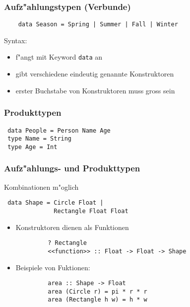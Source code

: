 \documentclass[german,10pt, a4paper, twocolumn]{scrartcl}
\theoremstyle{definition}
\theoremstyle{remark}
\begin{document}
\subsubsection{Aufz"ahlungstypen (Verbunde)}

\small
\begin{verbatim}
	data Season = Spring | Summer | Fall | Winter
\end{verbatim}
\normalsize

Syntax:
\begin{itemize}
	\item f"angt mit Keyword \verb#data# an
	\item gibt verschiedene eindeutig genannte Konstruktoren
	\item erster Buchstabe von Konstruktoren muss gross sein
\end{itemize}

\subsubsection{Produkttypen}

\small
\begin{verbatim}
 data People = Person Name Age
 type Name = String
 type Age = Int
\end{verbatim}
\normalsize

\subsubsection{Aufz"ahlungs- und Produkttypen}

Kombinationen m"oglich
\small
\begin{verbatim}
 data Shape = Circle Float |
              Rectangle Float Float
\end{verbatim}
\normalsize

\begin{itemize}
	\item Konstruktoren dienen als Funktionen
		\small
		\begin{verbatim}
		 ? Rectangle
		 <<function>> :: Float -> Float -> Shape
		\end{verbatim}
		\normalsize
	\item Beispiele von Fuktionen:
		\small
		\begin{verbatim}
		 area :: Shape -> Float
		 area (Circle r) = pi * r * r
		 area (Rectangle h w) = h * w
		\end{verbatim}
		\normalsize
\end{itemize}
\end{document}

